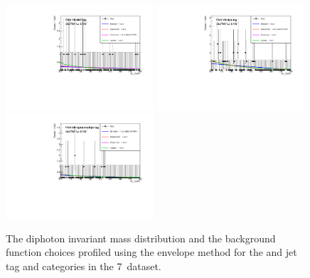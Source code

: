 \begin{figure}
  \includegraphics[width=0.49\textwidth]{analysis/plots/multipdf_plots/cat8_7TeV.pdf}
  \includegraphics[width=0.49\textwidth]{analysis/plots/multipdf_plots/cat10_7TeV.pdf}\\
  \includegraphics[width=0.49\textwidth]{analysis/plots/multipdf_plots/cat9_7TeV.pdf}
  \caption{The diphoton invariant mass distribution and the background function choices profiled using the envelope method for the \VH \MET and jet tag and \ttH categories in the 7~\TeV dataset.}
  \label{fig:multipdf2}
\end{figure}


